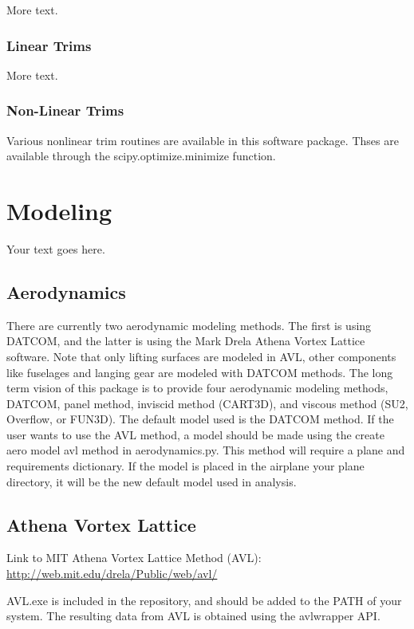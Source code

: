 \documentclass[11pt]{article} %
\begin{document}
More text.

\subsubsection{Linear Trims}

More text.

\subsubsection{Non-Linear Trims}

Various nonlinear trim routines are available in this software package. Thses are available through the scipy.optimize.minimize function. 

\section{Modeling}

Your text goes here.

\subsection{Aerodynamics}

There are currently two aerodynamic modeling methods. The first is using DATCOM, and the latter is using the Mark Drela Athena Vortex Lattice software. Note that only lifting surfaces are modeled in AVL, other components like fuselages and langing gear are modeled with DATCOM methods. The long term vision of this package is to provide four aerodynamic modeling methods, DATCOM, panel method, inviscid method (CART3D), and viscous method (SU2, Overflow, or FUN3D). The default model used is the DATCOM method. If the user wants to use the AVL method, a model should be made using the create aero model avl method in aerodynamics.py. This method will require a plane and requirements dictionary. If the model is placed in the airplane your plane directory, it will be the new default model used in analysis.

\subsection{Athena Vortex Lattice}

Link to MIT Athena Vortex Lattice Method (AVL): \\
\url{http://web.mit.edu/drela/Public/web/avl/}

AVL.exe is included in the repository, and should be added to the PATH of your system. The resulting data from AVL is obtained using the avlwrapper API. 
\end{document}
